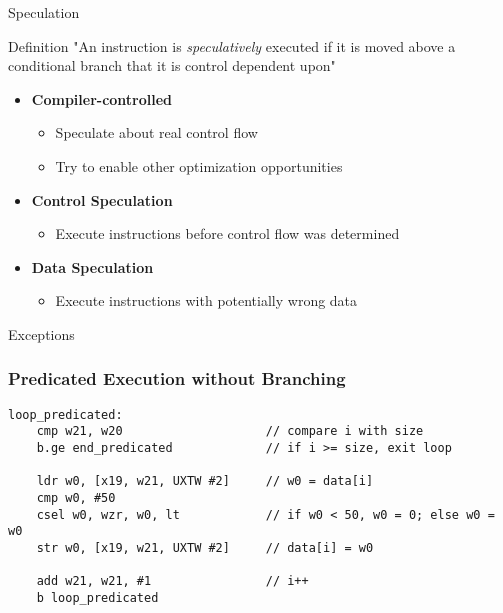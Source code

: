 \documentclass[presentation]{beamer}
\begin{document}
\begin{frame}{Speculation}
    \begin{block}{Definition}
    "An instruction is \textit{speculatively} executed if it is moved above a conditional branch that it is control dependent upon"~\cite{chang95}
    \end{block}
    \begin{itemize}
        \item \textbf{Compiler-controlled}
            \begin{itemize}
              \item Speculate about real control flow
              \item Try to enable other optimization opportunities
        \end{itemize}
        \item \textbf{Control Speculation}
        \begin{itemize}
               \item Execute instructions before control flow was determined 
        \end{itemize}
        \item \textbf{Data Speculation}
        \begin{itemize}
            \item Execute instructions with potentially wrong data 
        \end{itemize}
    \end{itemize}
\end{frame}

\begin{frame}{Exceptions}
        
\end{frame}
    
\begin{frame}[fragile]
\frametitle{Predicated Execution without Branching}

\begin{lstlisting}[style=AsmStyle]
loop_predicated:
    cmp w21, w20                    // compare i with size
    b.ge end_predicated             // if i >= size, exit loop

    ldr w0, [x19, w21, UXTW #2]     // w0 = data[i]
    cmp w0, #50
    csel w0, wzr, w0, lt            // if w0 < 50, w0 = 0; else w0 = w0
    str w0, [x19, w21, UXTW #2]     // data[i] = w0

    add w21, w21, #1                // i++
    b loop_predicated
\end{lstlisting}

\end{frame}
\end{document}
